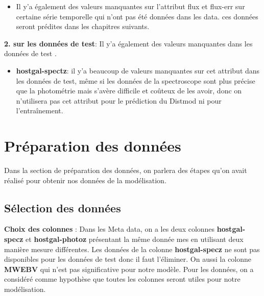 \begin{itemize}
    \item Il y'a également des valeurs manquantes sur l'attribut flux et flux-err sur certaine série temporelle qui n'ont pas été données dans les data. ces données seront prédites dans les chapitres suivants.
\end{itemize}
\newline

\textbf{2. sur les données de test}: Il y'a également des valeurs manquantes dans les données de test .
\newline
\begin{itemize}
    \item \textbf{hostgal-spectz}: il y'a beaucoup de valeurs manquantes sur cet attribut dans les données de test, même si les données de la spectroscope sont plus précise que la photométrie mais s'avère difficile et coûteux de les avoir, donc on n'utilisera pas cet attribut pour le prédiction du Distmod ni pour l'entraînement.  
\end{itemize}




\section{Préparation des données}
Dans la section de préparation des données, on parlera des étapes qu’on avait réalisé pour obtenir nos données de la modélisation.
\subsection{Sélection des données}
\textbf{Choix des colonnes} : Dans les Meta data, on a les deux colonnes \textbf{hostgal-specz} et\textbf{ hostgal-photoz} présentant la même donnée mes en utilisant deux manière mesure différentes. Les données de la colonne \textbf{hostgal-specz} ne sont pas disponibles pour les données de test donc il faut l’éliminer. On aussi la colonne \textbf{MWEBV} qui n’est pas significative pour notre modèle. Pour les données, on a considéré comme hypothèse que toutes les colonnes seront utiles pour notre modélisation.
